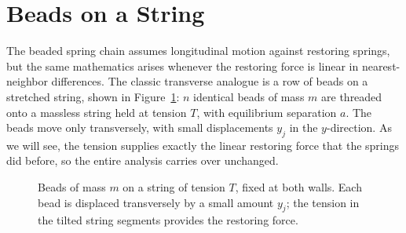 \section{Beads on a String}

The beaded spring chain assumes longitudinal motion against restoring springs, but the same mathematics arises whenever the restoring force is linear in nearest-neighbor differences. The classic transverse analogue is a row of beads on a stretched string, shown in Figure~\ref{fig:beads-string}: $n$ identical beads of mass $m$ are threaded onto a massless string held at tension $T$, with equilibrium separation $a$. The beads move only transversely, with small displacements $y_j$ in the $y$-direction. As we will see, the tension supplies exactly the linear restoring force that the springs did before, so the entire analysis carries over unchanged.

\begin{figure}[H]
    \centering
    \caption{Beads of mass $m$ on a string of tension $T$, fixed at both walls. Each bead is displaced transversely by a small amount $y_j$; the tension in the tilted string segments provides the restoring force.}
    \label{fig:beads-string}
\end{figure}

